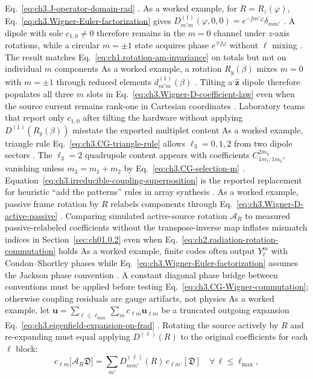 Eq.~\eqref{eq:ch3.J-operator-domain-rad} .
As a worked example, for \(R=R_z(\varphi)\), Eq.~\eqref{eq:ch3.Wigner-Euler-factorization} gives
\(D^{(1)}_{m'm}(\varphi,0,0)=e^{-\jj m'\varphi}\delta_{mm'}\) . A dipole with sole
\(c_{1,0}\neq 0\) therefore remains in the \(m=0\) channel under \(z\)-axis rotations, while a circular
\(m=\pm1\) state acquires phase \(e^{\mp\jj\varphi}\) without \(\ell\) mixing .
The result matches Eq.~\eqref{eq:ch1.rotation-am-invariance} on totals but not on individual \(m\) components
As a worked example, a rotation \(R_y(\beta)\) mixes \(m=0\) with \(m=\pm1\) through reduced elements \(d^{(1)}_{m'm}(\beta)\)
. Tilting a \(\hat{\mathbf{z}}\) dipole therefore populates all three \(m\) slots in
Eq.~\eqref{eq:ch3.Wigner-D-coefficient-law} even when the source current remains rank-one in Cartesian
coordinates . Laboratory teams that report only \(c_{1,0}\) after tilting the
hardware without applying \(D^{(1)}(R_y(\beta))\) misstate the exported multiplet content
As a worked example, triangle rule Eq.~\eqref{eq:ch3.CG-triangle-rule} allows \(\ell_3=0,1,2\) from two dipole sectors
. The \(\ell_3=2\) quadrupole content appears with coefficients
\(C_{1 m_1;1 m_2}^{2 m_3}\), vanishing unless \(m_3=m_1+m_2\) by Eq.~\eqref{eq:ch3.CG-selection-m}
. Equation~\eqref{eq:ch3.irreducible-coupling-superposition} is the reported replacement for
heuristic ``add the patterns'' rules in array synthesis .
As a worked example, passive frame rotation by \(R\) relabels components through
Eq.~\eqref{eq:ch3.Wigner-D-active-passive} . Comparing simulated active-source rotation
\(\mathcal{A}_R\) to measured passive-relabeled coefficients without the transpose-inverse map inflates
mismatch indices in Section~\ref{sec:ch01.0.2} even when Eq.~\eqref{eq:ch2.radiation-rotation-commutation} holds
As a worked example, finite codes often output \(Y_\ell^m\) with Condon--Shortley phases while
Eq.~\eqref{eq:ch3.Wigner-Euler-factorization} assumes the Jackson phase convention
. A constant diagonal phase bridge between conventions must be applied before
testing Eq.~\eqref{eq:ch3.CG-Wigner-commutation}; otherwise coupling residuals are gauge artifacts, not physics
As a worked example, let \(\mathbf{u}=\sum_{\ell\le\ell_{\max}}\sum_m c_{\ell m}\mathbf{u}_{\ell m}\) be a truncated outgoing
expansion Eq.~\eqref{eq:ch3.eigenfield-expansion-on-frad} . Rotating the source actively by
\(R\) and re-expanding must equal applying \(D^{(\ell)}(R)\) to the original coefficients for each \(\ell\) block:
\begin{equation}
\label{eq:ch3.Wigner-truncation-consistency}
c_{\ell m}\big[\mathcal{A}_R\mathfrak{D}\big]
=
\sum_{m'}D^{(\ell)}_{m m'}(R)\,c_{\ell m'}[\mathfrak{D}]
\quad\forall\,\ell\le\ell_{\max},
\end{equation}
